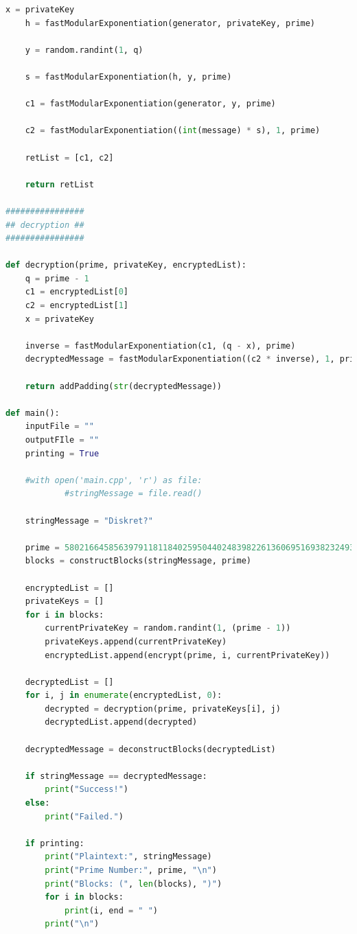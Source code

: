 \documentclass{article}
\begin{document}
\begin{lstlisting}[language=Python,breaklines=true,showspaces=false]
    x = privateKey
    h = fastModularExponentiation(generator, privateKey, prime)

    y = random.randint(1, q)

    s = fastModularExponentiation(h, y, prime)

    c1 = fastModularExponentiation(generator, y, prime)

    c2 = fastModularExponentiation((int(message) * s), 1, prime)

    retList = [c1, c2]

    return retList

################
## decryption ##
################

def decryption(prime, privateKey, encryptedList):
    q = prime - 1
    c1 = encryptedList[0]
    c2 = encryptedList[1]
    x = privateKey

    inverse = fastModularExponentiation(c1, (q - x), prime)
    decryptedMessage = fastModularExponentiation((c2 * inverse), 1, prime)

    return addPadding(str(decryptedMessage))

def main():
    inputFile = ""
    outputFIle = ""
    printing = True

    #with open('main.cpp', 'r') as file:
            #stringMessage = file.read()

    stringMessage = "Diskret?"

    prime = 58021664585639791181184025950440248398226136069516938232493687505822471836536824298822733710342250697739996825938232641940670857624514103125986134050997697160127301547995788468137887651823707102007839
    blocks = constructBlocks(stringMessage, prime)

    encryptedList = []
    privateKeys = []
    for i in blocks:
        currentPrivateKey = random.randint(1, (prime - 1))
        privateKeys.append(currentPrivateKey)
        encryptedList.append(encrypt(prime, i, currentPrivateKey))

    decryptedList = []
    for i, j in enumerate(encryptedList, 0):
        decrypted = decryption(prime, privateKeys[i], j)
        decryptedList.append(decrypted)

    decryptedMessage = deconstructBlocks(decryptedList)

    if stringMessage == decryptedMessage:
        print("Success!")
    else:
        print("Failed.")

    if printing:
        print("Plaintext:", stringMessage)
        print("Prime Number:", prime, "\n")
        print("Blocks: (", len(blocks), ")")
        for i in blocks:
            print(i, end = " ")
        print("\n")


\end{lstlisting}
\end{document}

